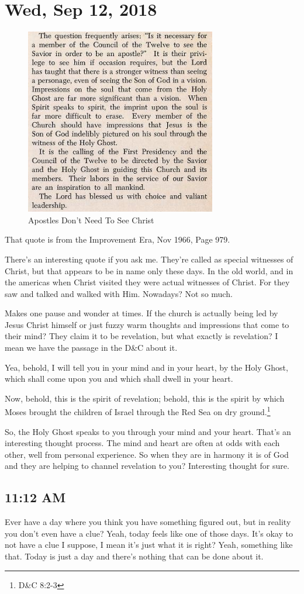 \section{Wed, Sep 12, 2018}

\begin{figure}[h!]
  \centering
  \includegraphics[width=.5\linewidth]{2018/images/apostle.png}
  \caption{Apostles Don't Need To See Christ}
  \label{fig:apostle}
\end{figure}

That quote is from the Improvement Era, Nov 1966, Page 979.

There's an interesting quote if you ask me. They're called as special witnesses of
Christ, but that appears to be in name only these days. In the old world, and in the
americas when Christ visited they were actual witnesses of Christ. For they saw and
talked and walked with Him. Nowadays? Not so much.

Makes one pause and wonder at times. If the church is actually being led by Jesus
Christ himself or just fuzzy warm thoughts and impressions that come to their mind?
They claim it to be revelation, but what exactly is revelation? I mean we have the
passage in the D\&C about it.

\begin{displayquote}
Yea, behold, I will tell you in your mind and in your heart, by the Holy Ghost, 
which shall come upon you and which shall dwell in your heart.

Now, behold, this is the spirit of revelation; behold, this is the spirit by which 
Moses brought the children of Israel through the Red Sea on dry ground.\footnote{
D\&C 8:2-3
}
\end{displayquote}

So, the Holy Ghost speaks to you through your mind and your heart. That's an
interesting thought process. The mind and heart are often at odds with each other,
well from personal experience. So when they are in harmony it is of God and they are
helping to channel revelation to you? Interesting thought for sure.

\subsection{11:12 AM}

Ever have a day where you think you have something figured out, but in reality you
don't even have a clue? Yeah, today feels like one of those days. It's okay to not
have a clue I suppose, I mean it's just what it is right? Yeah, something like that.
Today is just a day and there's nothing that can be done about it.
